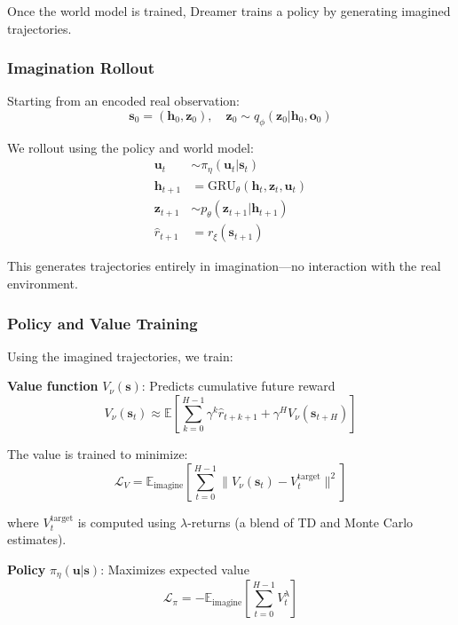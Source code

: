Once the world model is trained, Dreamer trains a policy by generating imagined trajectories.

\subsubsection{Imagination Rollout}

Starting from an encoded real observation:
\begin{equation}
\mathbf{s}_0 = (\mathbf{h}_0, \mathbf{z}_0), \quad \mathbf{z}_0 \sim q_\phi(\mathbf{z}_0 | \mathbf{h}_0, \mathbf{o}_0)
\end{equation}

We rollout using the policy and world model:
\begin{align}
\mathbf{u}_t &\sim \pi_\eta(\mathbf{u}_t | \mathbf{s}_t) \\
\mathbf{h}_{t+1} &= \text{GRU}_\theta(\mathbf{h}_t, \mathbf{z}_t, \mathbf{u}_t) \\
\mathbf{z}_{t+1} &\sim p_\theta(\mathbf{z}_{t+1} | \mathbf{h}_{t+1}) \\
\hat{r}_{t+1} &= r_\xi(\mathbf{s}_{t+1})
\end{align}

This generates trajectories entirely in imagination---no interaction with the real environment.

\subsubsection{Policy and Value Training}

Using the imagined trajectories, we train:

\textbf{Value function} $V_\nu(\mathbf{s})$: Predicts cumulative future reward
\begin{equation}
V_\nu(\mathbf{s}_t) \approx \mathbb{E}\left[ \sum_{k=0}^{H-1} \gamma^k \hat{r}_{t+k+1} + \gamma^H V_\nu(\mathbf{s}_{t+H}) \right]
\end{equation}

The value is trained to minimize:
\begin{equation}
\mathcal{L}_V = \mathbb{E}_{\text{imagine}}\left[ \sum_{t=0}^{H-1} \| V_\nu(\mathbf{s}_t) - V_t^{\text{target}} \|^2 \right]
\end{equation}

where $V_t^{\text{target}}$ is computed using $\lambda$-returns (a blend of TD and Monte Carlo estimates).

\textbf{Policy} $\pi_\eta(\mathbf{u} | \mathbf{s})$: Maximizes expected value
\begin{equation}
\mathcal{L}_\pi = -\mathbb{E}_{\text{imagine}}\left[ \sum_{t=0}^{H-1} V_t^\lambda \right]
\end{equation}

